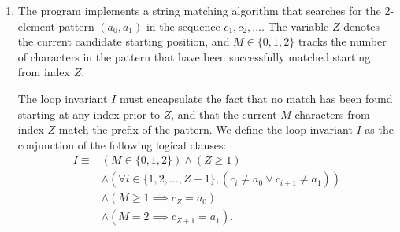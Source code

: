 \documentclass{article}
\begin{document}
\begin{enumerate}[label=\fbox{\arabic*}]
\begin{enumerate}[label=(\arabic*)]
          \item The time-averaged Eulerian velocity is $\langle u \rangle = -\left\langle \frac{\partial \psi}{\partial y} \right\rangle$.
          Since $\langle u_1 \rangle = \frac{1}{T} \int_0^T -\omega(1-ky)e^{-ky} \cos(kx-\omega t) dt = 0$, the $\mathcal{O}(\epsilon)$ contribution vanishes, and $\langle u \rangle = \epsilon^2 \langle u_2 \rangle + \mathcal{O}(\epsilon^3)$.
          From the boundary condition derived in (2), at order $\epsilon^2$ we have:
          \[
            -\left. \frac{\partial \psi_2}{\partial y} \right|_{y=0} = -\omega k \sin^2(kx - \omega t).
          \]
          Taking the time average of this boundary condition gives $\langle u_2(x, 0) \rangle = -\omega k \langle \sin^2(kx - \omega t) \rangle = -\frac{\omega k}{2}$.
          The time-averaged stream function $\psi_{20}(y) = \langle \psi_2 \rangle$ must satisfy the steady biharmonic equation $\frac{d^4 \psi_{20}}{dy^4} = 0$.
          Thus, $\psi_{20}(y) = C_0 + C_1 y + C_2 y^2 + C_3 y^3$.
          The corresponding velocity is $\langle u_2(y) \rangle = -\psi_{20}'(y) = -C_1 - 2C_2 y - 3C_3 y^2$.
          For the velocity to be bounded as $y \to \infty$, we must have $C_2 = C_3 = 0$.
          Therefore, $\langle u_2(y) \rangle = -C_1$ is a constant for all $y \ge 0$.
          Matching with the boundary condition at $y = 0$, we find $\langle u_2(y) \rangle = -\frac{\omega k}{2}$.
          Hence, the time-averaged velocity up to $\mathcal{O}(\epsilon^2)$ is the uniform steady streaming drift:
          \[
            \langle u \rangle = -\epsilon^2 \frac{\omega k}{2}.
          \]
        \end{enumerate}

  \item %
        The program implements a string matching algorithm that searches for the 2-element pattern $(a_0, a_1)$ in the sequence $c_1, c_2, \dots$. The variable $Z$ denotes the current candidate starting position, and $M \in \{0, 1, 2\}$ tracks the number of characters in the pattern that have been successfully matched starting from index $Z$.
        
        The loop invariant $I$ must encapsulate the fact that no match has been found starting at any index prior to $Z$, and that the current $M$ characters from index $Z$ match the prefix of the pattern. We define the loop invariant $I$ as the conjunction of the following logical clauses:
        \begin{align*}
          I \equiv {} & (M \in \{0, 1, 2\}) \wedge (Z \ge 1) \\
          & \wedge \left( \forall i \in \{1, 2, \dots, Z-1\}, (c_i \neq a_0 \vee c_{i+1} \neq a_1) \right) \\
          & \wedge \left( M \ge 1 \implies c_Z = a_0 \right) \\
          & \wedge \left( M = 2 \implies c_{Z+1} = a_1 \right).
        \end{align*}
        

\end{enumerate}
\end{document}
